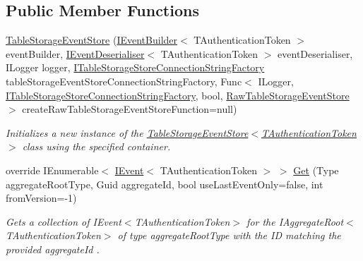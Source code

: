 \subsection*{Public Member Functions}
\begin{DoxyCompactItemize}
\item 
\hyperlink{classCqrs_1_1Azure_1_1BlobStorage_1_1Events_1_1TableStorageEventStore_a25a65bc4a027b2a16ebf02e763ac3b95_a25a65bc4a027b2a16ebf02e763ac3b95}{Table\+Storage\+Event\+Store} (\hyperlink{interfaceCqrs_1_1Events_1_1IEventBuilder}{I\+Event\+Builder}$<$ T\+Authentication\+Token $>$ event\+Builder, \hyperlink{interfaceCqrs_1_1Events_1_1IEventDeserialiser}{I\+Event\+Deserialiser}$<$ T\+Authentication\+Token $>$ event\+Deserialiser, I\+Logger logger, \hyperlink{interfaceCqrs_1_1Azure_1_1BlobStorage_1_1ITableStorageStoreConnectionStringFactory}{I\+Table\+Storage\+Store\+Connection\+String\+Factory} table\+Storage\+Event\+Store\+Connection\+String\+Factory, Func$<$ I\+Logger, \hyperlink{interfaceCqrs_1_1Azure_1_1BlobStorage_1_1ITableStorageStoreConnectionStringFactory}{I\+Table\+Storage\+Store\+Connection\+String\+Factory}, bool, \hyperlink{classCqrs_1_1Azure_1_1BlobStorage_1_1Events_1_1TableStorageEventStore_1_1RawTableStorageEventStore}{Raw\+Table\+Storage\+Event\+Store} $>$ create\+Raw\+Table\+Storage\+Event\+Store\+Function=null)
\begin{DoxyCompactList}\small\item\em Initializes a new instance of the \hyperlink{classCqrs_1_1Azure_1_1BlobStorage_1_1Events_1_1TableStorageEventStore_a25a65bc4a027b2a16ebf02e763ac3b95_a25a65bc4a027b2a16ebf02e763ac3b95}{Table\+Storage\+Event\+Store$<$\+T\+Authentication\+Token$>$} class using the specified container. \end{DoxyCompactList}\item 
override I\+Enumerable$<$ \hyperlink{interfaceCqrs_1_1Events_1_1IEvent}{I\+Event}$<$ T\+Authentication\+Token $>$ $>$ \hyperlink{classCqrs_1_1Azure_1_1BlobStorage_1_1Events_1_1TableStorageEventStore_a420c94c86d8d1c2959aee8602f43c0c0_a420c94c86d8d1c2959aee8602f43c0c0}{Get} (Type aggregate\+Root\+Type, Guid aggregate\+Id, bool use\+Last\+Event\+Only=false, int from\+Version=-\/1)
\begin{DoxyCompactList}\small\item\em Gets a collection of I\+Event$<$\+T\+Authentication\+Token$>$ for the I\+Aggregate\+Root$<$\+T\+Authentication\+Token$>$ of type {\itshape aggregate\+Root\+Type}  with the ID matching the provided {\itshape aggregate\+Id} . \end{DoxyCompactList}\item 

\end{DoxyCompactItemize}

